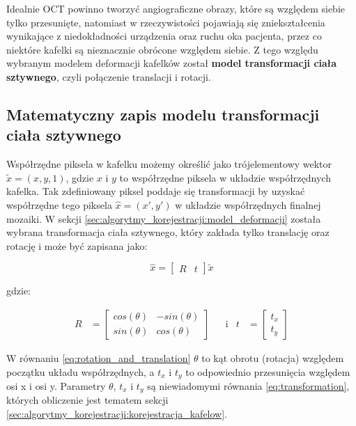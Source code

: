 Idealnie OCT powinno tworzyć angiograficzne obrazy, które są względem siebie tylko przesunięte, natomiast w rzeczywistości pojawiają się zniekształcenia wynikające z niedokładności urządzenia oraz ruchu oka pacjenta, przez co niektóre kafelki są nieznacznie obrócone względem siebie. Z tego względu wybranym modelem deformacji kafelków został \textbf{model transformacji ciała sztywnego}, czyli połączenie translacji i rotacji.

\subsection{Matematyczny zapis modelu transformacji ciała sztywnego}

Współrzędne piksela w kafelku możemy określić jako trójelementowy wektor $\widetilde{x}=(x, y, 1)$, gdzie $x$ i $y$ to współrzędne piksela w układzie współrzędnych kafelka. Tak zdefiniowany piksel poddaje się transformacji by uzyskać współrzędne tego piksela $\hat{x}=(x', y')$ w układzie współrzędnych finalnej mozaiki. W sekcji \ref{sec:algorytmy_korejestracji:model_deformacji} została wybrana transformacja ciała sztywnego, który zakłada tylko translację oraz rotację i może być zapisana jako:

\begin{equation}
\hat{x}=\begin{bmatrix}R&t\end{bmatrix}\widetilde{x}
\label{eq:transformation}
\end{equation}

gdzie:

\begin{align}
R &= \begin{bmatrix}cos(\theta)&-sin(\theta)\\sin(\theta)&cos(\theta)\end{bmatrix} &&\text{i} & t &= \begin{bmatrix}t_{x}\\t_{y}\end{bmatrix}
\label{eq:rotation_and_translation}
\end{align}

W równaniu \ref{eq:rotation_and_translation} $\theta$ to kąt obrotu (rotacja) względem początku układu współrzędnych, a $t_{x}$ i $t_{y}$ to odpowiednio przesunięcia względem osi x i osi y. Parametry $\theta$, $t_{x}$ i $t_{y}$ są niewiadomymi równania \ref{eq:transformation}, których obliczenie jest tematem sekcji \ref{sec:algorytmy_korejestracji:korejestracja_kafelow}.

